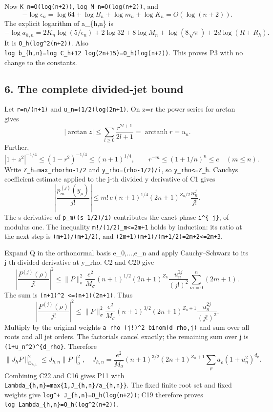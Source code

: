 Now \texttt{K\_n=O(log(n+2))}, \texttt{log\ M\_n=O(log(n+2))}, and \[
-\log\epsilon_n=
\log64+\log B_n+\log m_n+\log K_n=O(\log(n+2)).
\] The explicit logarithm of a\_\{h,n\} is \[
-\log a_{h,n}=
2K_n\log(5/\epsilon_n)+2\log32+8\log M_n
+\log(8\sqrt\pi)+2d\log(R+R_h).
\tag{C19}
\] It is \texttt{O\_h(log\^{}2(n+2))}. Also \texttt{log\ b\_\{h,n\}=log\ C\_h+12\ log(2n+15)=O\_h(log(n+2))}. This proves P3 with no change to the constants.

\subsection{6. The complete divided-jet bound}\label{mrcoerc:the-complete-divided-jet-bound}

Let \texttt{r=n/(n+1)} and \texttt{u\_n=(1/2)log(2n+1)}. On \textbar z\textbar=r the power series for arctan gives \[
|\arctan z|\le\sum_{l\ge0}\frac{r^{2l+1}}{2l+1}
=\operatorname{arctanh}r=u_n.
\] Further, \[
|1+z^2|^{-1/4}\le(1-r^2)^{-1/4}\le(n+1)^{1/4},
\qquad r^{-m}\le(1+1/n)^n\le e\quad(m\le n).
\] Write \texttt{Z\_h=max\_rho\textbar{}rho-1/2\textbar{}} and \texttt{y\_rho=(rho-1/2)/i}, so \texttt{\textbar{}y\_rho\textbar{}\textless{}=Z\_h}. Cauchy\textquotesingle s coefficient estimate applied to the j-th divided y derivative of C1 gives \[
\left|\frac{p_m^{(j)}(y_\rho)}{j!}\right|
\le m!\,e(n+1)^{1/4}(2n+1)^{Z_h/2}\frac{u_n^j}{j!}.
\tag{C20}
\] The s derivative of \texttt{p\_m((s-1/2)/i)} contributes the exact phase \texttt{i\^{}\{-j\}}, of modulus one. The inequality \texttt{m!/(1/2)\_m\textless{}=2m+1} holds by induction: its ratio at the next step is \texttt{(m+1)/(m+1/2)}, and \texttt{(2m+1)(m+1)/(m+1/2)=2m+2\textless{}=2m+3}.

Expand Q in the orthonormal basis e\_0,...,e\_n and apply Cauchy--Schwarz to its j-th divided derivative at y\_rho. C2 and C20 give \[
\left|\frac{P^{(j)}(\rho)}{j!}\right|^2
\le\|P\|_\sigma^2\frac{e^2}{M_\sigma}(n+1)^{1/2}
(2n+1)^{Z_h}\frac{u_n^{2j}}{(j!)^2}
 \sum_{m=0}^n(2m+1).
\] The sum is \texttt{(n+1)\^{}2\ \textless{}=(n+1)(2n+1)}. Thus \[
\left|\frac{P^{(j)}(\rho)}{j!}\right|^2
\le\|P\|_\sigma^2\frac{e^2}{M_\sigma}(n+1)^{3/2}
(2n+1)^{Z_h+1}\frac{u_n^{2j}}{(j!)^2}.
\tag{C21}
\] Multiply by the original weights \texttt{a\_rho\ (j!)\^{}2\ binom(d\_rho,j)} and sum over all roots and all jet orders. The factorials cancel exactly; the remaining sum over j is \texttt{(1+u\_n\^{}2)\^{}\{d\_rho\}}. Therefore \[
\|J_hP\|_{\mathsf D_{h,1}}^2\le J_{h,n}\|P\|_\sigma^2,
\quad
J_{h,n}=\frac{e^2}{M_\sigma}(n+1)^{3/2}(2n+1)^{Z_h+1}
 \sum_\rho a_\rho(1+u_n^2)^{d_\rho}.
\tag{C22}
\] Combining C22 and C16 gives P11 with \texttt{Lambda\_\{h,n\}=max\{1,J\_\{h,n\}/a\_\{h,n\}\}}. The fixed finite root set and fixed weights give \texttt{log\^{}+\ J\_\{h,n\}=O\_h(log(n+2))}; C19 therefore proves \texttt{log\ Lambda\_\{h,n\}=O\_h(log\^{}2(n+2))}.

